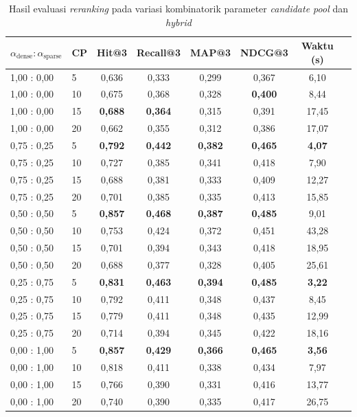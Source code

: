 \begin{table}[H]
	\centering
	\caption{Hasil evaluasi \textit{reranking} pada variasi kombinatorik parameter \textit{candidate pool} dan \textit{hybrid}}
	\label{tbl:appendix_combinatorial}
	\small
	\setlength{\tabcolsep}{4pt}
	\begin{tabular}{llcccccc}
		\toprule
		$\alpha_\text{dense} : \alpha_\text{sparse}$ & CP & Hit@3 & Recall@3 & MAP@3 & NDCG@3 & Waktu (s) \\
		\midrule
		1{,}00 : 0{,}00 & 5  & 0{,}636 & 0{,}333 & 0{,}299 & 0{,}367 & 6{,}10 \\
		1{,}00 : 0{,}00 & 10 & 0{,}675 & 0{,}368 & 0{,}328 & \textbf{0{,}400} & 8{,}44 \\
		1{,}00 : 0{,}00 & 15 & \textbf{0{,}688} & \textbf{0{,}364} & 0{,}315 & 0{,}391 & 17{,}45 \\
		1{,}00 : 0{,}00 & 20 & 0{,}662 & 0{,}355 & 0{,}312 & 0{,}386 & 17{,}07 \\
		\midrule
		0{,}75 : 0{,}25 & 5  & \textbf{0{,}792} & \textbf{0{,}442} & \textbf{0{,}382} & \textbf{0{,}465} & \textbf{4{,}07} \\
		0{,}75 : 0{,}25 & 10 & 0{,}727 & 0{,}385 & 0{,}341 & 0{,}418 & 7{,}90 \\
		0{,}75 : 0{,}25 & 15 & 0{,}688 & 0{,}381 & 0{,}333 & 0{,}409 & 12{,}27 \\
		0{,}75 : 0{,}25 & 20 & 0{,}701 & 0{,}385 & 0{,}335 & 0{,}413 & 15{,}85 \\
		\midrule
		0{,}50 : 0{,}50 & 5  & \textbf{0{,}857} & \textbf{0{,}468} & \textbf{0{,}387} & \textbf{0{,}485} & 9{,}01 \\
		0{,}50 : 0{,}50 & 10 & 0{,}753 & 0{,}424 & 0{,}372 & 0{,}451 & 43{,}28 \\
		0{,}50 : 0{,}50 & 15 & 0{,}701 & 0{,}394 & 0{,}343 & 0{,}418 & 18{,}95 \\
		0{,}50 : 0{,}50 & 20 & 0{,}688 & 0{,}377 & 0{,}328 & 0{,}405 & 25{,}61 \\
		\midrule
		0{,}25 : 0{,}75 & 5  & \textbf{0{,}831} & \textbf{0{,}463} & \textbf{0{,}394} & \textbf{0{,}485} & \textbf{3{,}22} \\
		0{,}25 : 0{,}75 & 10 & 0{,}792 & 0{,}411 & 0{,}348 & 0{,}437 & 8{,}45 \\
		0{,}25 : 0{,}75 & 15 & 0{,}779 & 0{,}411 & 0{,}348 & 0{,}435 & 12{,}99 \\
		0{,}25 : 0{,}75 & 20 & 0{,}714 & 0{,}394 & 0{,}345 & 0{,}422 & 18{,}16 \\
		\midrule
		0{,}00 : 1{,}00 & 5  & \textbf{0{,}857} & \textbf{0{,}429} & \textbf{0{,}366} & \textbf{0{,}465} & \textbf{3{,}56} \\
		0{,}00 : 1{,}00 & 10 & 0{,}818 & 0{,}411 & 0{,}338 & 0{,}434 & 7{,}97 \\
		0{,}00 : 1{,}00 & 15 & 0{,}766 & 0{,}390 & 0{,}331 & 0{,}416 & 13{,}77 \\
		0{,}00 : 1{,}00 & 20 & 0{,}740 & 0{,}390 & 0{,}335 & 0{,}417 & 26{,}75 \\
		\bottomrule
	\end{tabular}
\end{table}
